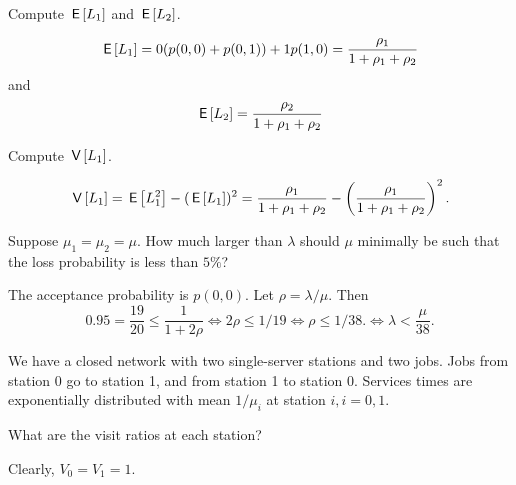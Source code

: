 \begin{exercise}[201704]{2}
  Compute  $\,\mathsf{E}\left[L_1\right]$ and $\,\mathsf{E}\left[L_2\right]$.
\begin{solution}
    \begin{equation*}
    \,\mathsf{E}\left[L_1\right] = 0 (p(0,0) + p(0,1)) + 1 p(1,0) = \frac{\rho_1}{1+\rho_1 + \rho_2}
    \end{equation*}
and
    \begin{equation*}
    \,\mathsf{E}\left[L_2\right] = \frac{\rho_2}{1+\rho_1 + \rho_2}
    \end{equation*}
\end{solution}
\end{exercise}

\begin{exercise}[201704]{2}
  Compute  $\,\mathsf{V}\left[L_1\right]$.
\begin{solution}
    \begin{equation*}
      \,\mathsf{V}\left[L_1\right] = \,\mathsf{E}\left[L_1^2\right] - (\,\mathsf{E}\left[L_1\right])^2= \frac{\rho_1}{1+\rho_1 + \rho_2} - \left(\frac{\rho_1}{1+\rho_1 + \rho_2}\right)^2.
    \end{equation*}
\end{solution}
\end{exercise}

\begin{exercise}[201704]
  Suppose $\mu_1=\mu_2=\mu$. How much larger than $\lambda$ should
  $\mu$ minimally be such that the loss probability is less than
  $5\%$?
\begin{solution}
    The acceptance probability is $p(0,0)$. Let $\rho=\lambda/\mu$. Then
    \begin{equation*}
      0.95 =\frac{19}{20}\leq \frac1{1+2\rho} \iff 2\rho \leq 1/19 \iff \rho \leq 1/38.
    \iff \lambda < \frac{\mu}{38}.
\end{equation*}
\end{solution}
\end{exercise}


We have a closed network with two single-server stations and two jobs. Jobs from station 0 go to station 1, and from station 1 to station 0.  Services times are exponentially distributed with mean $1/\mu_i$ at station $i, i=0,1$.

\begin{exercise}[201704]
What are the visit ratios at each station?
\begin{solution}
  Clearly, $V_0=V_1=1$.
\end{solution}
\end{exercise}

